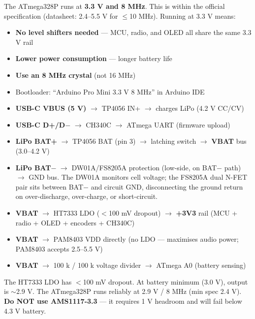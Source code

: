 \documentclass[a4paper,11pt]{article}
\renewcommand*{\,}{ }%
\begin{document}
\begin{infobox}
The ATmega328P runs at \textbf{3.3\,V and 8\,MHz}. This is within the official specification (datasheet: 2.4--5.5\,V for $\leq$10\,MHz). Running at 3.3\,V means:
\begin{itemize}[noitemsep]
    \item \textbf{No level shifters needed} --- MCU, radio, and OLED all share the same 3.3\,V rail
    \item \textbf{Lower power consumption} --- longer battery life
    \item \textbf{Use an 8\,MHz crystal} (not 16\,MHz)
    \item Bootloader: ``Arduino Pro Mini 3.3\,V 8\,MHz'' in Arduino IDE
\end{itemize}
\end{infobox}

\begin{itemize}[noitemsep]
    \item \textbf{USB-C VBUS (5\,V)} $\rightarrow$ TP4056 IN+ $\rightarrow$ charges LiPo (4.2\,V CC/CV)
    \item \textbf{USB-C D+/D$-$} $\rightarrow$ CH340C $\rightarrow$ ATmega UART (firmware upload)
    \item \textbf{LiPo BAT+} $\rightarrow$ TP4056 BAT (pin 3) $\rightarrow$ latching switch $\rightarrow$ \textbf{VBAT} bus (3.0--4.2\,V)
    \item \textbf{LiPo BAT$-$} $\rightarrow$ DW01A/FS8205A protection (low-side, on BAT$-$ path) $\rightarrow$ GND bus. The DW01A monitors cell voltage; the FS8205A dual N-FET pair sits between BAT$-$ and circuit GND, disconnecting the ground return on over-discharge, over-charge, or short-circuit.
    \item \textbf{VBAT} $\rightarrow$ HT7333 LDO ($<$100\,mV dropout) $\rightarrow$ \textbf{+3V3} rail (MCU + radio + OLED + encoders + CH340C)
    \item \textbf{VBAT} $\rightarrow$ PAM8403 VDD directly (no LDO --- maximises audio power; PAM8403 accepts 2.5--5.5\,V)
    \item \textbf{VBAT} $\rightarrow$ 100\,k / 100\,k voltage divider $\rightarrow$ ATmega A0 (battery sensing)
\end{itemize}

\begin{warningbox}
The HT7333 LDO has $<$100\,mV dropout. At battery minimum (3.0\,V), output is $\sim$2.9\,V. The ATmega328P runs reliably at 2.9\,V / 8\,MHz (min spec 2.4\,V). \\
\textbf{Do NOT use AMS1117-3.3} --- it requires 1\,V headroom and will fail below 4.3\,V battery.
\end{warningbox}
\end{document}
